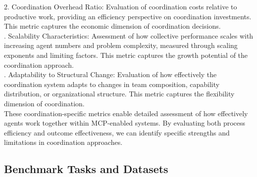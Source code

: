 2. Coordination Overhead Ratio: Evaluation of coordination costs relative to productive work, providing an efficiency perspective on coordination investments. This metric captures the economic dimension of coordination decisions.\\ . Scalability Characteristics: Assessment of how collective performance scales with increasing agent numbers and problem complexity, measured through scaling exponents and limiting factors. This metric captures the growth potential of the coordination approach.\\ . Adaptability to Structural Change: Evaluation of how effectively the coordination system adapts to changes in team composition, capability distribution, or organizational structure. This metric captures the flexibility dimension of coordination.\\ \newline
These coordination-specific metrics enable detailed assessment of how effectively agents work together within MCP-enabled systems. By evaluating both process efficiency and outcome effectiveness, we can identify specific strengths and limitations in coordination approaches.\\
\subsection{Benchmark Tasks and Datasets}
